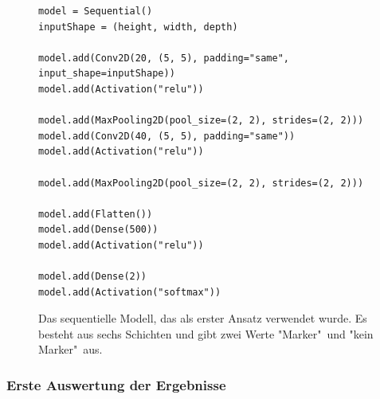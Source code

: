 \documentclass[conference]{IEEEtran}
\begin{document}
	\begin{figure}[!h]
		\centering
		\begin{verbatim}
model = Sequential()
inputShape = (height, width, depth)

model.add(Conv2D(20, (5, 5), padding="same", input_shape=inputShape))
model.add(Activation("relu"))

model.add(MaxPooling2D(pool_size=(2, 2), strides=(2, 2)))
model.add(Conv2D(40, (5, 5), padding="same"))
model.add(Activation("relu"))

model.add(MaxPooling2D(pool_size=(2, 2), strides=(2, 2)))

model.add(Flatten())
model.add(Dense(500))
model.add(Activation("relu"))

model.add(Dense(2))
model.add(Activation("softmax"))
		\end{verbatim}
		\caption{Das sequentielle Modell, das als erster Ansatz verwendet wurde. Es besteht aus sechs Schichten und gibt zwei Werte "Marker"\ und "kein Marker"\ aus.}
		\label{erstes Trainingsmodell}
	\end{figure}

	\subsubsection{Erste Auswertung der Ergebnisse}	%
\end{document}
